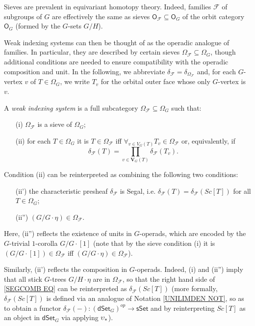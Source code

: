 \documentclass[a4paper,10pt
]{article}%
\begin{document}
Sieves are prevalent in equivariant homotopy theory. Indeed, families $\mathcal{F}$ of subgroups of $G$ are effectively the same as sieves $\mathsf{O}_{\mathcal{F}} \subseteq \mathsf{O}_G$
of the orbit category
$\mathsf{O}_G$ (formed by the $G$-sets $G/H$).

Weak indexing systems can then be thought of as the operadic analogue of families. In particular, they are described by certain sieves $\Omega_{\mathcal{F}} \subseteq \Omega_G$,
though additional conditions are needed to ensure compatibility with the operadic composition and unit.
In the following, we abbreviate 
$\delta_{\mathcal{F}} = \delta_{\Omega_{\mathcal{F}}}$ and,
for each $G$-vertex $v$ of $T \in \Omega_G$, we write 
$T_v$ for the orbital outer face whose only
$G$-vertex is $v$.

\begin{definition}
A \textit{weak indexing system} is a full subcategory
$\Omega_{\mathcal{F}} \subseteq \Omega_G$ such that:
\begin{itemize}
	\item[(i)] $\Omega_{\mathcal{F}}$ is a sieve of 
              $\Omega_G$;              
	\item[(ii)] for each $T \in \Omega_G$ it is
	$T \in \Omega_{\mathcal{F}}$ iff 
	$\forall_{v \in V_G(T)} T_v \in \Omega_{\mathcal{F}}$
	or, equivalently, if
\begin{equation}\label{SEGCOMB EQ}
\delta_{\mathcal{F}}(T) =
\prod_{v \in \boldsymbol{V}_G(T)}\delta_{\mathcal{F}}(T_v).
\end{equation}
\end{itemize}
\end{definition}


\begin{remark}\label{SEGCOMB REM}
	Condition (ii) can be reinterpreted as combining the following two conditions:
\begin{itemize}
	\item[(ii')] the characteristic presheaf $\delta_{\mathcal{F}}$ is Segal, i.e. 
	$\delta_{\mathcal{F}}(T) = 
	\delta_{\mathcal{F}}(Sc[T])$
	for all $T \in \Omega_G$;
	\item[(ii'')] $(G/G \cdot \eta) \in \Omega_{\mathcal{F}}$.
\end{itemize}

Here, (ii'') reflects the existence of units in $G$-operads,
which are encoded by the
$G$-trivial $1$-corolla $G/G\cdot [1]$
(note that by the sieve condition (i) it is
$(G/G\cdot [1]) \in \Omega_{\mathcal{F}}$
iff 
$(G/G\cdot \eta) \in \Omega_{\mathcal{F}}$).

Similarly, (ii') reflects the composition in $G$-operads.
Indeed, (i) and (ii'') imply that
all stick $G$-trees $G/H \cdot \eta$ are in 
$\Omega_{\mathcal{F}}$,
so that the right hand side of \eqref{SEGCOMB EQ}
can be reinterpreted as $\delta_{\mathcal{F}}(Sc[T])$
(more formally, $\delta_{\mathcal{F}}(Sc[T])$ is defined via an analogue of 
Notation \ref{UNILIMDEN NOT}, 
so as to obtain a functor
$\delta_{\mathcal{F}}(-) \colon 
(\mathsf{dSet}_G)^{op} \to \mathsf{sSet}$ 
and by reinterpreting $Sc[T]$ as an object in 
$\mathsf{dSet}_G$ via applying $\upsilon_{\**}$).
\end{remark}
\end{document}
